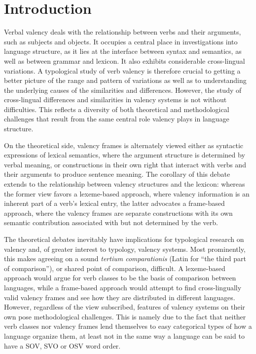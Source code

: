 \chapter{Introduction}\label{chapter:introduction}

Verbal valency deals with the relationship between verbs and their arguments, such as subjects and objects. It occupies a central place in investigations into language structure, as it lies at the interface between syntax and semantics, as well as between grammar and lexicon. It also exhibits considerable cross-lingual variations. A typological study of verb valency is therefore crucial to getting a better picture of the range and pattern of variations as well as to understanding the underlying causes of the similarities and differences. However, the study of cross-lingual differences and similarities in valency systems is not without difficulties. This reflects a diversity of both theoretical and methodological challenges that result from the same central role valency plays in language structure. 

On the theoretical side, valency frames is alternately viewed either as syntactic expressions of lexical semantics, where the argument structure is determined by verbal meaning, or constructions in their own right that interact with verbs and their arguments to produce sentence meaning. The corollary of this debate extends to the relationship between valency structures and the lexicon: whereas the former view favors a lexeme-based approach, where valency information is an inherent part of a verb's lexical entry, the latter advocates a frame-based approach, where the valency frames are separate constructions with its own semantic contribution associated with but not determined by the verb.

The theoretical debates inevitably have implications for typological research on valency and, of greater interest to typology, valency systems. Most prominently, this makes agreeing on a sound \textit{tertium comparationis} (Latin for ``the third part of comparison''), or shared point of comparison, difficult. A lexeme-based approach would argue for verb classes to be the basis of comparison between languages, while a frame-based approach would attempt to find cross-lingually valid valency frames and see how they are distributed in different languages. However, regardless of the view subscribed, features of valency systems on their own pose methodological challenges. This is namely due to the fact that neither verb classes nor valency frames lend themselves to easy categorical types of how a language organize them, at least not in the same way a language can be said to have a SOV, SVO or OSV word order. 


